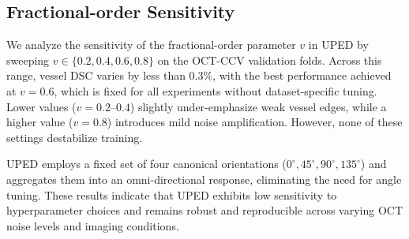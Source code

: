 \documentclass[lettersize,journal]{IEEEtran}
\begin{document}
\subsection{Fractional-order Sensitivity}
{\color{red}
We analyze the sensitivity of the fractional-order parameter $v$ in UPED by sweeping $v\in\{0.2,0.4,0.6,0.8\}$ on the OCT-CCV validation folds.
Across this range, vessel DSC varies by less than 0.3\%, with the best performance achieved at $v=0.6$, which is fixed for all experiments without dataset-specific tuning.
Lower values ($v=0.2$--$0.4$) slightly under-emphasize weak vessel edges, while a higher value ($v=0.8$) introduces mild noise amplification. However, none of these settings destabilize training.

UPED employs a fixed set of four canonical orientations ($0^\circ,45^\circ,90^\circ,135^\circ$) and aggregates them into an omni-directional response, eliminating the need for angle tuning.
These results indicate that UPED exhibits low sensitivity to hyperparameter choices and remains robust and reproducible across varying OCT noise levels and imaging conditions.
}
\end{document}
